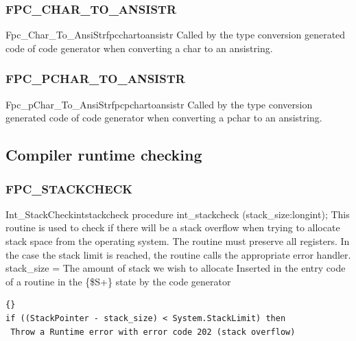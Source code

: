 \documentclass [a4paper,12pt]{article}
\begin{document}
\subsubsection{FPC{\_}CHAR{\_}TO{\_}ANSISTR}
\label{subsubsec:mylabel49}

\begin{functionl}{Fpc{\_}Char{\_}To{\_}AnsiStr}{fpcchartoansistr}
\Notes
Called by the type conversion generated code of code generator when
converting a char to an ansistring.
\end{functionl}

\subsubsection{FPC{\_}PCHAR{\_}TO{\_}ANSISTR}
\label{subsubsec:mylabel50}

\begin{functionl}{Fpc{\_}pChar{\_}To{\_}AnsiStr}{fpcpchartoansistr}
\Notes
Called by the type conversion generated code of code generator when
converting a pchar to an ansistring.
\end{functionl}


\subsection{Compiler runtime checking}
\label{subsec:compiler}

\subsubsection{FPC{\_}STACKCHECK}
\label{subsubsec:mylabel51}

\begin{procedurel}{Int{\_}StackCheck}{intstackcheck}
\Declaration
procedure int{\_}stackcheck (stack{\_}size:longint);
\Description
This routine is used to check if there will be a stack overflow when trying
to allocate stack space from the operating system. The routine must preserve
all registers. In the case the stack limit is reached, the routine calls the
appropriate error handler.
\Parameters
stack{\_}size = The amount of stack we wish to allocate
\Notes
Inserted in the entry code of a routine in the {\{}{\$}S+{\}} state by the code generator
\Algorithm
\begin{lstlisting}{}
if ((StackPointer - stack_size) < System.StackLimit) then
 Throw a Runtime error with error code 202 (stack overflow)
\end{lstlisting}
\end{procedurel}
\end{document}

